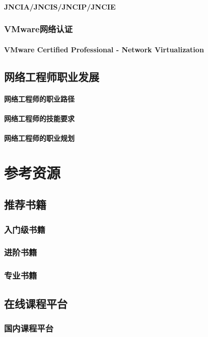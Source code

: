 \documentclass{book}
\begin{document}
\subsubsection{JNCIA/JNCIS/JNCIP/JNCIE}
\subsection{VMware网络认证}
\subsubsection{VMware Certified Professional - Network Virtualization}
\section{网络工程师职业发展}
\subsubsection{网络工程师的职业路径}
\subsubsection{网络工程师的技能要求}
\subsubsection{网络工程师的职业规划}

\backmatter

\chapter{参考资源}
\section{推荐书籍}
\subsection{入门级书籍}
\subsection{进阶书籍}
\subsection{专业书籍}
\section{在线课程平台}
\subsection{国内课程平台}
\end{document}
